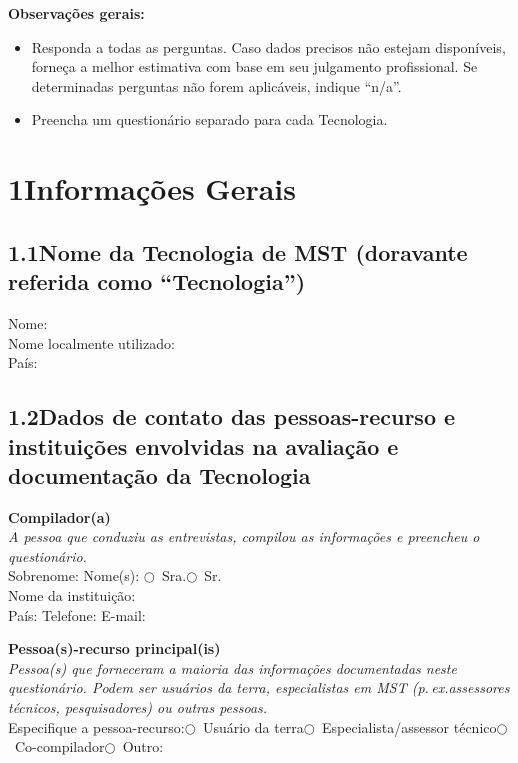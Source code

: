 \medskip\noindent
\textbf{Observações gerais:}
\begin{itemize}[nosep]
  \item Responda a todas as perguntas. Caso dados precisos não estejam disponíveis, forneça a melhor estimativa com base em seu julgamento profissional. Se determinadas perguntas não forem aplicáveis, indique ``n/a''.
  \item Preencha um questionário separado para cada Tecnologia.
\end{itemize}

\section{1\quad Informações Gerais}

\subsection{1.1\quad Nome da Tecnologia de MST (doravante referida como ``Tecnologia'')}

Nome: \dotfill\\
Nome localmente utilizado: \dotfill\\
País: \dotfill

\subsection{1.2\quad Dados de contato das pessoas-recurso e instituições envolvidas na avaliação e documentação da Tecnologia}

\noindent\textbf{Compilador(a)}\\
\textit{A pessoa que conduziu as entrevistas, compilou as informações e preencheu o questionário.}\\[4pt]
Sobrenome: \dotfill\quad Nome(s): \dotfill\quad $\bigcirc$~Sra.\quad $\bigcirc$~Sr.\\
Nome da instituição: \dotfill\\
País: \dotfill\quad Telefone: \dotfill\quad E-mail: \dotfill

\medskip\noindent\textbf{Pessoa(s)-recurso principal(is)}\\
\textit{Pessoa(s) que forneceram a maioria das informações documentadas neste questionário. Podem ser usuários da terra, especialistas em MST (p.\,ex.\@ assessores técnicos, pesquisadores) ou outras pessoas.}\\[4pt]
Especifique a pessoa-recurso:\quad $\bigcirc$~Usuário da terra\quad $\bigcirc$~Especialista/assessor técnico\quad $\bigcirc$~Co-compilador\quad $\bigcirc$~Outro: \dotfill

